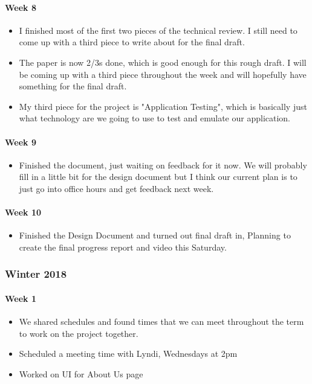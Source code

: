 \documentclass[onecolumn, draftclsnofoot,10pt, compsoc]{IEEEtran}
\begin{document}
      \paragraph{Week 8}
        \begin{itemize}
          \item I finished most of the first two pieces of the technical review. I still need to come up with a third piece to write about for the final draft.
          \item The paper is now 2/3s done, which is good enough for this rough draft. I will be coming up with a third piece throughout the week and will hopefully have something for the final draft.
          \item My third piece for the project is "Application Testing", which is basically just what technology are we going to use to test and emulate our application.
        \end{itemize}

      \paragraph{Week 9}
        \begin{itemize}
          \item Finished the document, just waiting on feedback for it now. We will probably fill in a little bit for the design document but I think our current plan is to just go into office hours and get feedback next week.
        \end{itemize}

      \paragraph{Week 10}
        \begin{itemize}
          \item Finished the Design Document and turned out final draft in, Planning to create the final progress report and video this Saturday.
        \end{itemize}

    \subsubsection{Winter 2018}
      \paragraph{Week 1}
        \begin{itemize}
          \item We shared schedules and found times that we can meet throughout the term to work on the project together.
          \item Scheduled a meeting time with Lyndi, Wednesdays at 2pm
          \item Worked on UI for About Us page
        \end{itemize}
\end{document}
